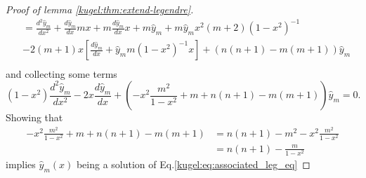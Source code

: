 \begin{proof}[Proof of lemma \ref{kugel:thm:extend-legendre}]
\begin{align*}
    &= \frac{d^2\hat{y}_m}{dx^2} + \frac{d\hat{y}_m}{dx}mx + m\frac{d\hat{y}_m}{dx}x + m\hat{y}_m + m\hat{y}_m x^2(m+2)(1-x^2)^{-1} \\
    &-2(m+1)x\left[  \frac{d\hat{y}_m}{dx} + \hat{y}_mm(1-x^2)^{-1}x \right] + (n(n+1)-m(m+1))\hat{y}_m\\
  \end{align*}
  and collecting some terms
  \begin{equation*}
    (1-x^2)\frac{d^2\hat{y}_m}{dx^2} - 2x\frac{d\hat{y}_m}{dx} + \left( -x^2 \frac{m^2}{1-x^2} + m+n(n+1)-m(m+1)\right)\hat{y}_m=0.
  \end{equation*}
  Showing that 
  \begin{align*}
    -x^2 \frac{m^2}{1-x^2} + m+n(n+1)-m(m+1) &= n(n+1)- m^2 -x^2 \frac{m^2}{1-x^2} \\
    &= n(n+1)- \frac{m}{1-x^2}
  \end{align*}
  implies $\hat{y}_m(x)$ being a solution of Eq.\eqref{kugel:eq:associated_leg_eq}
\end{proof}
